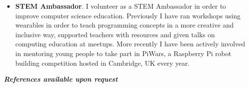 \documentclass{article}
\begin{document}
\begin{flushleft}
\begin{itemize}
\item \textbf{STEM Ambassador}. I volunteer as a STEM Ambassador in order to improve computer science education. Previously I have ran workshops using wearables in order to teach programming concepts in a more creative and inclusive way, supported teachers with resources and given talks on computing education at meetups. More recently I have been actively involved in mentoring young people to take part in PiWars, a Raspberry Pi robot building competition hosted in Cambridge, UK every year.\\[15pt]
\end{itemize}
\end{flushleft}

\textbf{\textit{References available upon request}}
\end{document}
